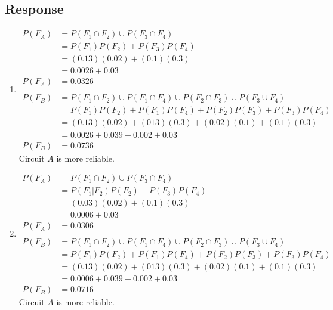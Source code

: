 \documentclass[13pt]{article}
\begin{document}
\subsection*{Response}
\begin{enumerate}[label=\textbf{\alph*.}]
\item
  \begin{align*}
    P(F_A) &= P(F_1 \cap F_2) \cup P(F_3 \cap F_4) \\
           &= P(F_1)P(F_2) + P(F_3)P(F_4) \\
           &= (0.13)(0.02) + (0.1)(0.3) \\
           &= 0.0026 + 0.03 \\
    P(F_A) &= 0.0326 \\ \\
    P(F_B) &= P(F_1 \cap F_2) \cup P(F_1 \cap F_4) \cup P(F_2 \cap
             F_3) \cup P(F_3 \cup F_4) \\
           &= P(F_1)P(F_2) + P(F_1)P(F_4) + P(F_2)P(F_3) +
             P(F_3)P(F_4) \\
           &= (0.13)(0.02) + (013)(0.3) + (0.02)(0.1) + (0.1)(0.3) \\
           &= 0.0026 + 0.039 + 0.002 + 0.03 \\
    P(F_B) &= 0.0736
  \end{align*}
  Circuit $A$ is more reliable.

\item
  \begin{align*}
    P(F_A) &= P(F_1 \cap F_2) \cup P(F_3 \cap F_4) \\
           &= P(F_1|F_2)P(F_2) + P(F_3)P(F_4) \\
           &= (0.03)(0.02) + (0.1)(0.3) \\
           &= 0.0006 + 0.03 \\
    P(F_A) &= 0.0306 \\ \\
    P(F_B) &= P(F_1 \cap F_2) \cup P(F_1 \cap F_4) \cup P(F_2 \cap
             F_3) \cup P(F_3 \cup F_4) \\
           &= P(F_1)P(F_2) + P(F_1)P(F_4) + P(F_2)P(F_3) +
             P(F_3)P(F_4) \\
           &= (0.13)(0.02) + (013)(0.3) + (0.02)(0.1) + (0.1)(0.3) \\
           &= 0.0006 + 0.039 + 0.002 + 0.03 \\
    P(F_B) &= 0.0716
  \end{align*}
  Circuit $A$ is more reliable.
\end{enumerate}
\end{document}
